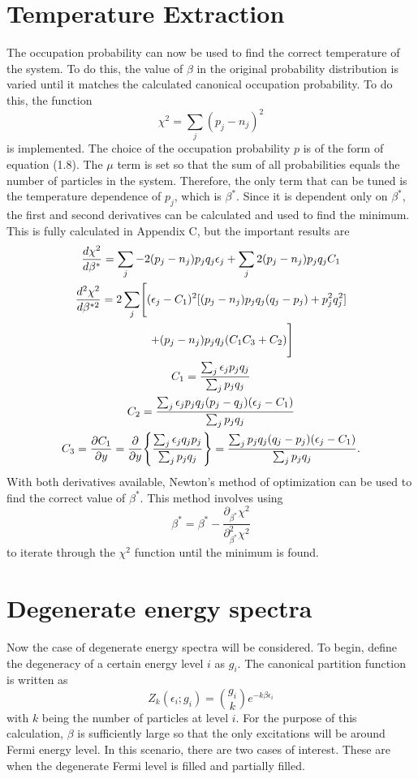 \section{Temperature Extraction}
The occupation probability can now be used to find the correct temperature of the system. To do this, the value of $\beta$ in the original probability distribution is varied until it matches the calculated canonical occupation probability. To do this, the function 
\begin{equation}
    \chi^2=\sum_j(p_j-n_j)^2
\end{equation}
is implemented. The choice of the occupation probability $p$ is of the form of equation (1.8). The $\mu$ term is set so that the sum of all probabilities equals the number of particles in the system. Therefore, the only term that can be tuned is the temperature dependence of $p_j$, which is $\beta^*$. Since it is dependent only on $\beta^*$, the first and second derivatives can be calculated and used to find the minimum. This is fully calculated in Appendix C, but the important results are 
\begin{gather}
    \frac{d\chi^2}{d\beta^*}=\sum_j -2(p_j-n_j)p_j q_j \epsilon_j+\sum_j 2(p_j-n_j)p_j q_j C_1\\
    \frac{d^2\chi^2}{d\beta^{*2}}=2\sum_j\Biggr[(\epsilon_j-C_1)^2[(p_j-n_j)p_jq_j(q_j-p_j)+p_j^2q_j^2]\nonumber\\
    \ \ \ \ \ \ +(p_j-n_j)p_jq_j(C_1C_3+C_2)\Biggr]\\
    C_1=\frac{\sum_j \epsilon_j p_j q_j}{\sum_j p_j q_j}\\
    C_2=\frac{\sum_j \epsilon_j p_j q_j(p_j - q_j)(\epsilon_j-C_1)}{\sum_j p_j q_j}\\
    C_3=\frac{\partial C_1}{\partial y}=\frac{\partial}{\partial 
    y}\qty{\frac{\sum_j \epsilon_j q_j p_j}{\sum_j p_j q_j}}=\frac{\sum_j p_j q_j(q_j-p_j)(\epsilon_j-C_1)}{\sum_j p_j q_j}.
\end{gather}
With both derivatives available, Newton's method of optimization can be used to find the correct value of $\beta^*$. This method involves using 
\begin{equation}
    \beta^*=\beta^*-\frac{\partial_{\beta^*}\chi^2}{\partial^2_{\beta^*}\chi^2}
\end{equation}
to iterate through the $\chi^2$ function until the minimum is found.

\section{Degenerate energy spectra}
Now the case of degenerate energy spectra will be considered. To begin, define the degeneracy of a certain energy level $i$ as $g_i$. The canonical partition function is written as
\begin{equation}
    Z_k(\epsilon_i;g_i)={g_i \choose k} e^{-k\beta\epsilon_i}
\end{equation}
with $k$ being the number of particles at level $i$.  For the purpose of this calculation, $\beta$ is sufficiently large so that the only excitations will be around Fermi energy level. In this scenario, there are two cases of interest. These are when the degenerate Fermi level is filled and partially filled. 
